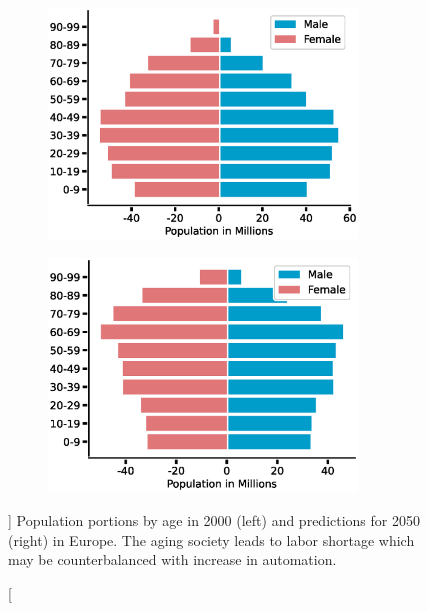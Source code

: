 \begin{figure}[h]
  \begin{subfigure}{0.5\textwidth}
    \centering
    \includegraphics[width=0.9\textwidth]{src/introduction/img/population_2000.eps}
  \end{subfigure}%
  \begin{subfigure}{0.5\textwidth}
    \centering
    \includegraphics[width=0.9\textwidth]{src/introduction/img/population_2050.eps}
  \end{subfigure}
  \caption
  []
  {
    Population portions by age in 2000 (left) and predictions for
    2050 (right) in Europe. The aging society leads to labor shortage
    which may be counterbalanced with increase in
    automation. \footnotemark
  }
  \label{fig:demographic_change}
\end{figure}


